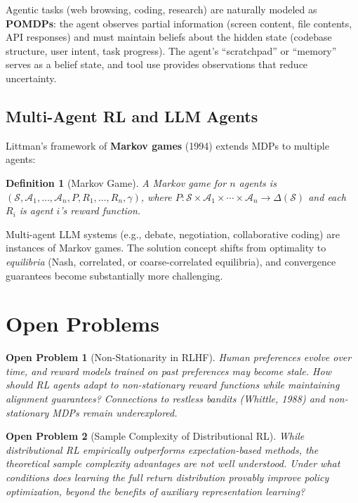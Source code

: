 \documentclass[11pt,a4paper]{article}
\newtheorem{definition}[theorem]{Definition}
\newtheorem{openproblem}{Open Problem}
\newcommand{\cS}{\mathcal{S}}
\newcommand{\cA}{\mathcal{A}}
\begin{document}
Agentic tasks (web browsing, coding, research) are naturally modeled as
\textbf{POMDPs}: the agent observes partial information (screen content, file
contents, API responses) and must maintain beliefs about the hidden state
(codebase structure, user intent, task progress). The agent's ``scratchpad''
or ``memory'' serves as a belief state, and tool use provides observations
that reduce uncertainty.

\subsection{Multi-Agent RL and LLM Agents}

Littman's framework of \textbf{Markov games} (1994) extends MDPs to multiple agents:
\begin{definition}[Markov Game]
A Markov game for $n$ agents is $(\cS, \cA_1, \ldots, \cA_n, P, R_1, \ldots, R_n, \gamma)$,
where $P : \cS \times \cA_1 \times \cdots \times \cA_n \to \Delta(\cS)$ and each
$R_i$ is agent $i$'s reward function.
\end{definition}

Multi-agent LLM systems (e.g., debate, negotiation, collaborative coding) are
instances of Markov games. The solution concept shifts from optimality to
\emph{equilibria} (Nash, correlated, or coarse-correlated equilibria), and
convergence guarantees become substantially more challenging.


\section{Open Problems}
\label{sec:open}

\begin{openproblem}[Non-Stationarity in RLHF]
Human preferences evolve over time, and reward models trained on past preferences
may become stale. How should RL agents adapt to non-stationary reward functions
while maintaining alignment guarantees? Connections to restless bandits
(Whittle, 1988) and non-stationary MDPs remain underexplored.
\end{openproblem}

\begin{openproblem}[Sample Complexity of Distributional RL]
While distributional RL empirically outperforms expectation-based methods,
the theoretical sample complexity advantages are not well understood.
Under what conditions does learning the full return distribution provably
improve policy optimization, beyond the benefits of auxiliary representation learning?
\end{openproblem}
\end{document}
